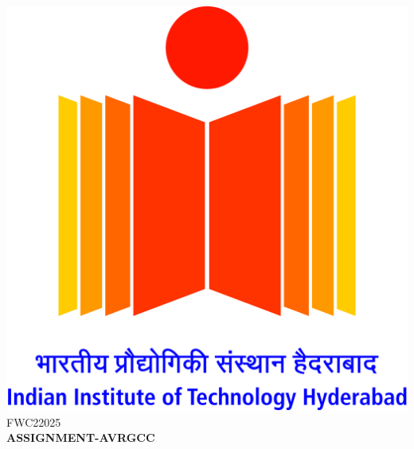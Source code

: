 \documentclass[a4paper,12pt]{report}
\begin{document}
\raggedright{\includegraphics[scale=0.07]{logo.jpg}}\hspace{12.425cm}\raggedleft FWC22025\vspace{2mm}
\\
\centering\Large\textbf{ASSIGNMENT-AVRGCC}\vspace{5mm}
\end{document}
